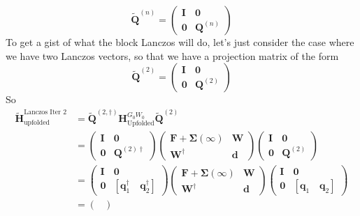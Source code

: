 \begin{equation}
    \bm{\tilde{Q}}^{(n)} = \begin{pmatrix}
        \bm{I} & \bm{0} \\
        \bm{0} & \bm{Q}^{(n)}
    \end{pmatrix}
\end{equation}
To get a gist of what the block Lanczos will do, let's just consider the case where we have two Lanczos vectors, so that we have a projection matrix of the form
\begin{equation}
    \bm{\tilde{Q}}^{(2)} = \begin{pmatrix}
        \bm{I} & \bm{0} \\
        \bm{0} & \bm{Q}^{(2)}
    \end{pmatrix}
\end{equation}
So
\begin{align}
    \bm{\tilde{H}}_{\text{upfolded}}^{\text{Lanczos Iter 2}} &= \bm{\tilde{Q}}^{(2,\dagger)} \bm{H}_{\text{Upfolded}}^{G_0W_0} \bm{\tilde{Q}}^{(2)}\\
    &= \begin{pmatrix}
        \bm{I} & \bm{0} \\
        \bm{0} & \bm{Q}^{(2)\dagger}
    \end{pmatrix}
    \begin{pmatrix}
         \bm{F} + \bm{\Sigma}(\infty) & \bm{W}\\
        \bm{W}^{\dagger} & \bm{d}
    \end{pmatrix}
    \begin{pmatrix}
        \bm{I} & \bm{0} \\
        \bm{0} & \bm{Q}^{(2)}
    \end{pmatrix}\\
    &= \begin{pmatrix}
        \bm{I} & \bm{0} \\
        \bm{0} & [\bm{q}_1^{\dag}\quad \bm{q}_2^{\dag}]
    \end{pmatrix}
    \begin{pmatrix}
        \bm{F} + \bm{\Sigma}(\infty) & \bm{W}\\
        \bm{W}^{\dagger} & \bm{d}
    \end{pmatrix}
    \begin{pmatrix}
        \bm{I} & \bm{0} \\
        \bm{0} & [\bm{q}_1\quad \bm{q}_2]
    \end{pmatrix}\\
    &= \begin{pmatrix}

\end{pmatrix}
\end{align}
